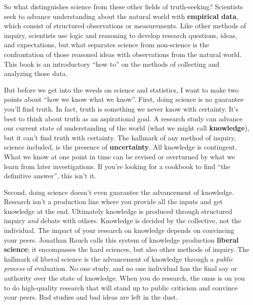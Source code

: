 \documentclass[
]{book}
\begin{document}
So what distinguishes science from these other fields of truth-seeking? Scientists seek to advance understanding about the natural world with \textbf{empirical data}, which consist of structured observations or measurements. Like other methods of inquiry, scientists use logic and reasoning to develop research questions, ideas, and expectations, but what separates science from non-science is the confrontation of those reasoned ideas with observations from the natural world. This book is an introductory ``how to'' on the methods of collecting and analyzing those data.

But before we get into the weeds on science and statistics, I want to make two points about ``how we know what we know''. First, doing science is no guarantee you'll find truth. In fact, truth is something we never know with certainty. It's best to think about truth as an aspirational goal. A research study can advance our current state of understanding of the world (what we might call \textbf{knowledge}), but it can't find truth with certainty. The hallmark of any method of inquiry, science included, is the presence of \textbf{uncertainty}. All knowledge is contingent. What we know at one point in time can be revised or overturned by what we learn from later investigations. If you're looking for a cookbook to find ``the definitive answer'', this isn't it.

Second, doing science doesn't even guarantee the advancement of knowledge. Research isn't a production line where you provide all the inputs and get knowledge at the end. Ultimately knowledge is produced through structured inquiry \emph{and} debate with others. Knowledge is decided by the collective, not the individual. The impact of your research on knowledge depends on convincing your peers. Jonathan Rauch calls this system of knowledge production \textbf{liberal science}; it encompasses the hard sciences, but also other methods of inquiry. The hallmark of liberal science is the advancement of knowledge through a \emph{public process} of evaluation. No one study, and no one individual has the final say or authority over the state of knowledge. When you do research, the onus is on you to do high-quality research that will stand up to public criticism and convince your peers. Bad studies and bad ideas are left in the dust.
\end{document}
